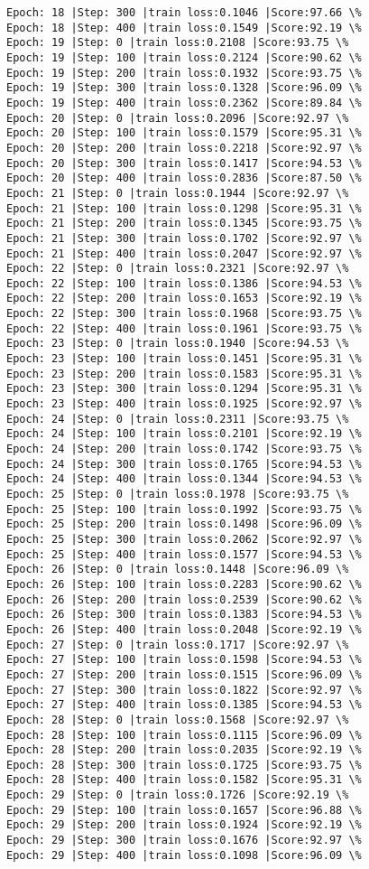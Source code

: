 \documentclass[11pt]{article}
\begin{document}
\begin{Verbatim}[commandchars=\\\{\}]
Epoch: 18 |Step: 300 |train loss:0.1046 |Score:97.66 \%
Epoch: 18 |Step: 400 |train loss:0.1549 |Score:92.19 \%
Epoch: 19 |Step: 0 |train loss:0.2108 |Score:93.75 \%
Epoch: 19 |Step: 100 |train loss:0.2124 |Score:90.62 \%
Epoch: 19 |Step: 200 |train loss:0.1932 |Score:93.75 \%
Epoch: 19 |Step: 300 |train loss:0.1328 |Score:96.09 \%
Epoch: 19 |Step: 400 |train loss:0.2362 |Score:89.84 \%
Epoch: 20 |Step: 0 |train loss:0.2096 |Score:92.97 \%
Epoch: 20 |Step: 100 |train loss:0.1579 |Score:95.31 \%
Epoch: 20 |Step: 200 |train loss:0.2218 |Score:92.97 \%
Epoch: 20 |Step: 300 |train loss:0.1417 |Score:94.53 \%
Epoch: 20 |Step: 400 |train loss:0.2836 |Score:87.50 \%
Epoch: 21 |Step: 0 |train loss:0.1944 |Score:92.97 \%
Epoch: 21 |Step: 100 |train loss:0.1298 |Score:95.31 \%
Epoch: 21 |Step: 200 |train loss:0.1345 |Score:93.75 \%
Epoch: 21 |Step: 300 |train loss:0.1702 |Score:92.97 \%
Epoch: 21 |Step: 400 |train loss:0.2047 |Score:92.97 \%
Epoch: 22 |Step: 0 |train loss:0.2321 |Score:92.97 \%
Epoch: 22 |Step: 100 |train loss:0.1386 |Score:94.53 \%
Epoch: 22 |Step: 200 |train loss:0.1653 |Score:92.19 \%
Epoch: 22 |Step: 300 |train loss:0.1968 |Score:93.75 \%
Epoch: 22 |Step: 400 |train loss:0.1961 |Score:93.75 \%
Epoch: 23 |Step: 0 |train loss:0.1940 |Score:94.53 \%
Epoch: 23 |Step: 100 |train loss:0.1451 |Score:95.31 \%
Epoch: 23 |Step: 200 |train loss:0.1583 |Score:95.31 \%
Epoch: 23 |Step: 300 |train loss:0.1294 |Score:95.31 \%
Epoch: 23 |Step: 400 |train loss:0.1925 |Score:92.97 \%
Epoch: 24 |Step: 0 |train loss:0.2311 |Score:93.75 \%
Epoch: 24 |Step: 100 |train loss:0.2101 |Score:92.19 \%
Epoch: 24 |Step: 200 |train loss:0.1742 |Score:93.75 \%
Epoch: 24 |Step: 300 |train loss:0.1765 |Score:94.53 \%
Epoch: 24 |Step: 400 |train loss:0.1344 |Score:94.53 \%
Epoch: 25 |Step: 0 |train loss:0.1978 |Score:93.75 \%
Epoch: 25 |Step: 100 |train loss:0.1992 |Score:93.75 \%
Epoch: 25 |Step: 200 |train loss:0.1498 |Score:96.09 \%
Epoch: 25 |Step: 300 |train loss:0.2062 |Score:92.97 \%
Epoch: 25 |Step: 400 |train loss:0.1577 |Score:94.53 \%
Epoch: 26 |Step: 0 |train loss:0.1448 |Score:96.09 \%
Epoch: 26 |Step: 100 |train loss:0.2283 |Score:90.62 \%
Epoch: 26 |Step: 200 |train loss:0.2539 |Score:90.62 \%
Epoch: 26 |Step: 300 |train loss:0.1383 |Score:94.53 \%
Epoch: 26 |Step: 400 |train loss:0.2048 |Score:92.19 \%
Epoch: 27 |Step: 0 |train loss:0.1717 |Score:92.97 \%
Epoch: 27 |Step: 100 |train loss:0.1598 |Score:94.53 \%
Epoch: 27 |Step: 200 |train loss:0.1515 |Score:96.09 \%
Epoch: 27 |Step: 300 |train loss:0.1822 |Score:92.97 \%
Epoch: 27 |Step: 400 |train loss:0.1385 |Score:94.53 \%
Epoch: 28 |Step: 0 |train loss:0.1568 |Score:92.97 \%
Epoch: 28 |Step: 100 |train loss:0.1115 |Score:96.09 \%
Epoch: 28 |Step: 200 |train loss:0.2035 |Score:92.19 \%
Epoch: 28 |Step: 300 |train loss:0.1725 |Score:93.75 \%
Epoch: 28 |Step: 400 |train loss:0.1582 |Score:95.31 \%
Epoch: 29 |Step: 0 |train loss:0.1726 |Score:92.19 \%
Epoch: 29 |Step: 100 |train loss:0.1657 |Score:96.88 \%
Epoch: 29 |Step: 200 |train loss:0.1924 |Score:92.19 \%
Epoch: 29 |Step: 300 |train loss:0.1676 |Score:92.97 \%
Epoch: 29 |Step: 400 |train loss:0.1098 |Score:96.09 \%

    \end{Verbatim}
\end{document}
